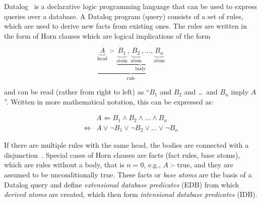 \documentclass{article}
\begin{document}
Datalog~\cite{green2013datalog} is a declarative logic programming language
that can be used to express queries over a database.
A Datalog program (query) consists of a set of rules,
which are used to derive new facts from existing ones.
The rules are written in the form of Horn clauses
which are logical implications of the form

\[
	\underbrace{
	\underbrace{A}_{\text{head}}
	\text{ :- }
	\underbrace{
	\underbrace{B_1}_{\text{atom}},
	\underbrace{B_2}_{\text{atom}},
	\ldots,
	\underbrace{B_n}_{\text{atom}}
	}_{\text{body}}
	}_{\text{rule}}
\]

\noindent{}and can be read (rather from right to left) as
``$B_1$ and $B_2$ and \ldots\ and $B_n$ imply $A$''.
Written in more mathematical notation, this can be expressed as:

\[
	\begin{aligned}
		                & A \Leftarrow B_1 \land B_2 \land \ldots \land B_n          \\
		\Leftrightarrow & A \lor \lnot B_1 \lor \lnot B_2 \lor \ldots \lor \lnot B_n
	\end{aligned}
\]

If there are multiple rules with the same head,
the bodies are connected with a disjunction~\cite{abo2024convergence}.
Special cases of Horn clauses are facts (fact rules, base atoms),
which are rules without a body, that is $n=0$, e.g., \( A \text{ :- } \text{true} \),
and they are assumed to be unconditionally true.
These facts or \emph{base atoms} are the basis of a Datalog query and
define \emph{extensional database predicates} (EDB)
from which \emph{derived atoms} are created,
which then form \emph{intensional database predicates} (IDB).

\end{document}
